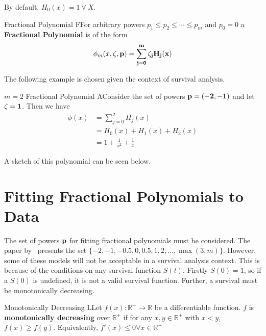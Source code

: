 By default, $H_0(x) = 1 \ \forall \ X$.

\begin{definition}{Fractional Polynomial}
    FFor arbitrary powers $p_1 \leq p_2 \leq \cdots \leq p_m$ and $p_0 = 0$ a \textbf{Fractional Polynomial} is of the form
    \[
        \phi_m(x, \bf{\zeta}, \bf{p}) = \sum_{j = 0}^{m} \zeta_j H_j(x) 
    \]
\end{definition}

The following example is chosen given the context of survival analysis.

\begin{example}{$m=2$ Fractional Polynomial}
    AConsider the set of powers $\bf{p} = (-2, -1)$ and let $\bf{\zeta} = \bf{1}$. Then we have 
    \begin{align*}
        \phi(x) &= \sum_{j=0}^{2}H_j(x) \\
                &= H_0(x) + H_1(x) + H_2(x) \\
                &= 1 + \frac{1}{x^2} + \frac{1}{x} 
    \end{align*}

    A sketch of this polynomial can be seen below.

    \begin{center}
        
    \end{center}
\end{example}

\section{Fitting Fractional Polynomials to Data}

The set of powers $\bf{p}$ for fitting fractional polynomials must be considered. The paper by~\cite{royston} presents the set $\{-2, -1, -0.5, 0, 0.5, 1, 2, \ldots, \max(3, m)\}$. However, some of these models will not be acceptable in a survival analysis context. This is because of the conditions on any survival function $S(t)$. Firstly $S(0) = 1$, so if a $S(0)$ is undefined, it is not a valid survival function. Further, a survival must be monotonically decreasing.

\begin{definition}{Monotonically Decreasing}
    LLet $f(x):\mathbb{R^{+}} \rightarrow \mathbb{R}$ be a differentiable function. $f$ is \textbf{monotonically decreasing} over $\mathbb{R^{+}}$ if for any $x, y \in \mathbb{R^{+}}$ with $x < y$, $f(x) \geq f(y)$. Equivalently, $f'(x) \leq 0 \forall x \in \mathbb{R^{+}}$ 
    \label{def:sd}
\end{definition}

